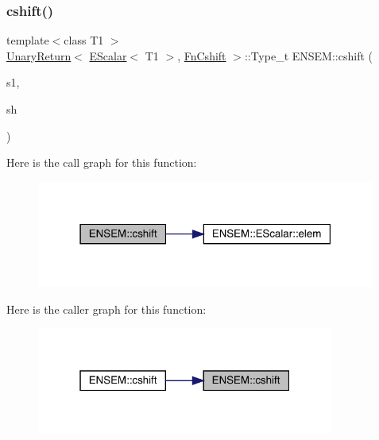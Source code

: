 \subsubsection{\texorpdfstring{cshift()}{cshift()}}
{\footnotesize\ttfamily template$<$class T1 $>$ \\
\mbox{\hyperlink{structENSEM_1_1UnaryReturn}{Unary\+Return}}$<$ \mbox{\hyperlink{classENSEM_1_1EScalar}{E\+Scalar}}$<$ T1 $>$, \mbox{\hyperlink{structENSEM_1_1FnCshift}{Fn\+Cshift}} $>$\+::Type\+\_\+t E\+N\+S\+E\+M\+::cshift (\begin{DoxyParamCaption}\item[{const \mbox{\hyperlink{classENSEM_1_1EScalar}{E\+Scalar}}$<$ T1 $>$ \&}]{s1,  }\item[{int}]{sh }\end{DoxyParamCaption})\hspace{0.3cm}{\ttfamily [inline]}}

Here is the call graph for this function\+:
\nopagebreak
\begin{figure}[H]
\begin{center}
\leavevmode
\includegraphics[width=316pt]{d4/dca/group__escalar_ga4a9bfa7287ccf8fef9605aa9e9a44884_cgraph}
\end{center}
\end{figure}
Here is the caller graph for this function\+:
\nopagebreak
\begin{figure}[H]
\begin{center}
\leavevmode
\includegraphics[width=277pt]{d4/dca/group__escalar_ga4a9bfa7287ccf8fef9605aa9e9a44884_icgraph}
\end{center}
\end{figure}
\mbox{\label{group__escalar_ga80b6028648c4f7d8f84f04d129bfa976}} 
